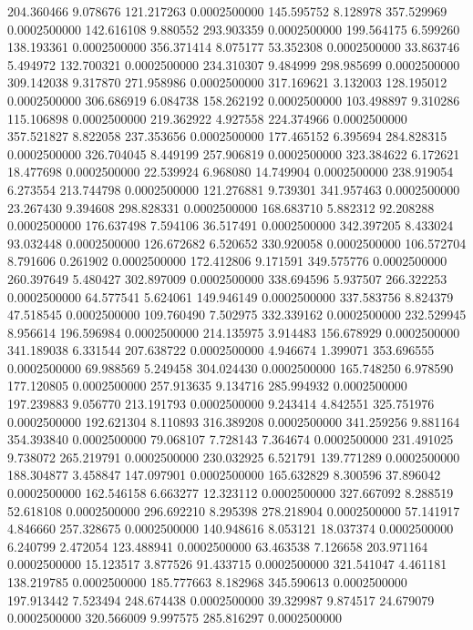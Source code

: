 204.360466 9.078676 121.217263 0.0002500000
145.595752 8.128978 357.529969 0.0002500000
142.616108 9.880552 293.903359 0.0002500000
199.564175 6.599260 138.193361 0.0002500000
356.371414 8.075177 53.352308 0.0002500000
33.863746 5.494972 132.700321 0.0002500000
234.310307 9.484999 298.985699 0.0002500000
309.142038 9.317870 271.958986 0.0002500000
317.169621 3.132003 128.195012 0.0002500000
306.686919 6.084738 158.262192 0.0002500000
103.498897 9.310286 115.106898 0.0002500000
219.362922 4.927558 224.374966 0.0002500000
357.521827 8.822058 237.353656 0.0002500000
177.465152 6.395694 284.828315 0.0002500000
326.704045 8.449199 257.906819 0.0002500000
323.384622 6.172621 18.477698 0.0002500000
22.539924 6.968080 14.749904 0.0002500000
238.919054 6.273554 213.744798 0.0002500000
121.276881 9.739301 341.957463 0.0002500000
23.267430 9.394608 298.828331 0.0002500000
168.683710 5.882312 92.208288 0.0002500000
176.637498 7.594106 36.517491 0.0002500000
342.397205 8.433024 93.032448 0.0002500000
126.672682 6.520652 330.920058 0.0002500000
106.572704 8.791606 0.261902 0.0002500000
172.412806 9.171591 349.575776 0.0002500000
260.397649 5.480427 302.897009 0.0002500000
338.694596 5.937507 266.322253 0.0002500000
64.577541 5.624061 149.946149 0.0002500000
337.583756 8.824379 47.518545 0.0002500000
109.760490 7.502975 332.339162 0.0002500000
232.529945 8.956614 196.596984 0.0002500000
214.135975 3.914483 156.678929 0.0002500000
341.189038 6.331544 207.638722 0.0002500000
4.946674 1.399071 353.696555 0.0002500000
69.988569 5.249458 304.024430 0.0002500000
165.748250 6.978590 177.120805 0.0002500000
257.913635 9.134716 285.994932 0.0002500000
197.239883 9.056770 213.191793 0.0002500000
9.243414 4.842551 325.751976 0.0002500000
192.621304 8.110893 316.389208 0.0002500000
341.259256 9.881164 354.393840 0.0002500000
79.068107 7.728143 7.364674 0.0002500000
231.491025 9.738072 265.219791 0.0002500000
230.032925 6.521791 139.771289 0.0002500000
188.304877 3.458847 147.097901 0.0002500000
165.632829 8.300596 37.896042 0.0002500000
162.546158 6.663277 12.323112 0.0002500000
327.667092 8.288519 52.618108 0.0002500000
296.692210 8.295398 278.218904 0.0002500000
57.141917 4.846660 257.328675 0.0002500000
140.948616 8.053121 18.037374 0.0002500000
6.240799 2.472054 123.488941 0.0002500000
63.463538 7.126658 203.971164 0.0002500000
15.123517 3.877526 91.433715 0.0002500000
321.541047 4.461181 138.219785 0.0002500000
185.777663 8.182968 345.590613 0.0002500000
197.913442 7.523494 248.674438 0.0002500000
39.329987 9.874517 24.679079 0.0002500000
320.566009 9.997575 285.816297 0.0002500000
